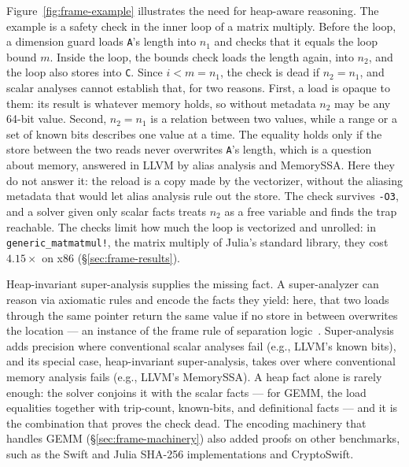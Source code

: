 \documentclass[acmsmall,screen,nonacm]{acmart}
\begin{document}
Figure~\ref{fig:frame-example} illustrates the need for heap-aware
reasoning. The example is a safety check in the inner loop of a matrix
multiply. Before the loop, a dimension guard loads \texttt{A}'s length
into $n_1$ and checks that it equals the loop bound $m$. Inside the
loop, the bounds check loads the length again, into $n_2$, and the loop
also stores into \texttt{C}. Since $i < m = n_1$, the check is dead if
$n_2 = n_1$, and scalar analyses cannot establish that, for two
reasons. First, a load is opaque to them: its result is whatever memory
holds, so without metadata $n_2$ may be any 64-bit value. Second,
$n_2 = n_1$ is a relation between two values, while a range or a set of
known bits describes one value at a time. The equality holds only if
the store between the two reads never overwrites \texttt{A}'s length,
which is a question about memory, answered in LLVM by alias analysis and
MemorySSA. Here they do not answer it: the reload is a copy made by the
vectorizer, without the aliasing metadata that would let alias analysis
rule out the store. The check survives \texttt{-O3}, and a solver given
only scalar facts treats $n_2$ as a free variable and finds the trap
reachable. The checks limit how much the loop is vectorized and
unrolled: in \texttt{generic\_matmatmul!}, the matrix multiply of
Julia's standard library, they cost $4.15\times$ on x86
(\S\ref{sec:frame-results}).

Heap-invariant super-analysis supplies the missing fact. A
super-analyzer can reason via axiomatic rules and encode the facts they
yield: here, that two loads through the same pointer return the same
value if no store in between overwrites the location --- an instance of
the frame rule of separation logic~\cite{reynolds2002separation}.
Super-analysis adds precision where conventional scalar analyses fail
(e.g., LLVM's known bits), and its special case, heap-invariant
super-analysis, takes over where conventional memory analysis fails
(e.g., LLVM's MemorySSA). A heap fact alone is rarely enough: the solver conjoins it with
the scalar facts --- for GEMM, the load equalities together with
trip-count, known-bits, and definitional facts --- and it is the
combination that proves the check dead. The encoding machinery that
handles GEMM (\S\ref{sec:frame-machinery}) also added proofs on other
benchmarks, such as the Swift and Julia SHA-256 implementations and
CryptoSwift.
\end{document}
